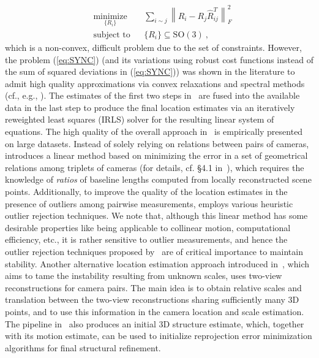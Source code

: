 \documentclass[10pt]{article}
\begin{document}
\begin{equation}
\label{eq:SYNC}
\begin{aligned}
&\underset{{\scriptstyle \{R_i\}}}{\text{minimize}}
& & \sum_{i\sim j}  \left\| R_i-R_j\hat{R}_{ij}^T\right\|_F^2 \\
& \text{subject to}
& & \{R_i\}\subseteq\mbox{SO}(3) \ ,
\end{aligned}
\end{equation}
which is a non-convex, difficult problem due to the set of constraints. However, the problem (\ref{eq:SYNC}) (and its variations using robust cost functions instead of the sum of squared deviations in (\ref{eq:SYNC})) was shown in the literature to admit high quality approximations via convex relaxations and spectral methods (cf., e.g., \cite{MicaAmitSfM,CvXSfM,GovinduRot,LanhuiSync,Mihai3DASAP}). The estimates of the first two steps in~\cite{ArrigoniSyncSfM} are fused into the available data in the last step to produce the final location estimates via an iteratively reweighted least squares (IRLS) solver for the resulting linear system of equations. The high quality of the overall approach in~\cite{ArrigoniSyncSfM} is empirically presented on large datasets. Instead of solely relying on relations between pairs of cameras, \cite{JiangTriLin} introduces a linear method based on minimizing the error in a set of geometrical relations among triplets of cameras (for details, cf. \S4.1 in~\cite{JiangTriLin}), which requires the knowledge of \textit{ratios} of baseline lengths computed from locally reconstructed scene points. Additionally, to improve the quality of the location estimates in the presence of outliers among pairwise measurements, \cite{JiangTriLin} employs various heuristic outlier rejection techniques. We note that, although this linear method has some desirable properties like being applicable to collinear motion, computational efficiency, etc., it is rather sensitive to outlier measurements, and hence the outlier rejection techniques proposed by~\cite{JiangTriLin} are of critical importance to maintain stability. Another alternative location estimation approach introduced in~\cite{MultiLinear}, which aims to tame the instability resulting from unknown scales, uses two-view reconstructions for camera pairs. The main idea is to obtain relative scales and translation between the two-view reconstructions sharing sufficiently many $3$D points, and to use this information in the camera location and scale estimation. The pipeline in~\cite{MultiLinear} also produces an initial $3$D structure estimate, which, together with its motion estimate, can be used to initialize reprojection error minimization algorithms for final structural refinement.
\end{document}
